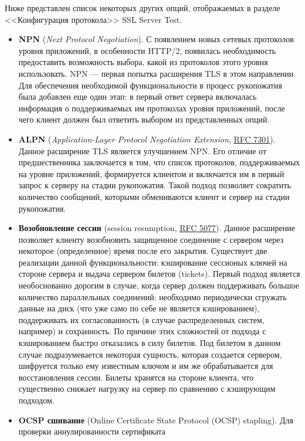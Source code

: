 Ниже представлен список некоторых других опций, отображаемых в разделе <<Конфигурация протокола>> SSL Server Test. 
\begin{itemize}
    \item \textbf{NPN} (\emph{Next Protocol Negotiation}). С появлением новых сетевых протоколов уровня приложений, в особенности
        HTTP/2, появилась необходимость предоставить возможность выбора, какой из протоколов этого уровня использовать. NPN --- 
        первая попытка расширения TLS в этом направлении. Для обеспечения необходимой функциональности в процесс рукопожатия была 
        добавлен еще один этап: в первый ответ сервера включалась информация о поддерживаемых им протоколах уровня приложений, после
        чего клиент должен был ответить выбором из представленных опций.
    \item \textbf{ALPN} (\emph{Application-Layer Protocol Negotiation Extension},  \href{https://tools.ietf.org/html/rfc7301}{RFC 
        7301}). Данное расширение TLS является улучшением NPN. Его отличие от предшественника заключается в том, что список 
        протоколов, поддерживаемых на уровне приложений, формируется клиентом и включается им в первый запрос к серверу на стадии
        рукопожатия. Такой подход позволяет сократить количество сообщений, которыми обмениваются клиент и сервер на стадии 
        рукопожатия. 
    \item \textbf{Возобновление сессии} (session resumption, \href{https://tools.ietf.org/html/rfc5077}{RFC 5077}). Данное 
        расширение позволяет клиенту возобновить защищенное соединение с сервером через некоторое (определенное) время после его 
        закрытия. Существует две реализации данной функциональности: кэширование сессионых ключей на стороне сервера и выдача 
        сервером билетов (tickets). Первый подход является необоснованно дорогим в случае, когда сервер должен поддерживать большое 
        количество параллельных соединений: необходимо периодически сгружать данные на диск (что уже само по себе не является 
        кэшированием), поддерживать их согласованность (в случае распределенных систем, например) и сохранность. По причине этих 
        сложностей от подхода с кэшированием быстро отказались в силу билетов. Под билетом в данном случае подразумевается некоторая
        сущность, которая создается сервером, шифруется только ему известным ключом и им же обрабатывается для восстановления 
        сессии. Билеты хранятся на стороне клиента, что существенно снижает нагрузку на сервер по сравнению с кэширующим подходом.
    \item \textbf{OCSP сшивание} (Online Certificate State Protocol (OCSP) stapling). Для проверки аннулированности сертификата 

\end{itemize}
